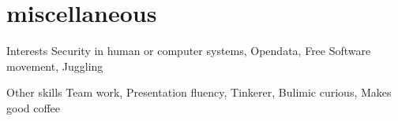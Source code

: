 \documentclass[]{friggeri-cv} %
\begin{document}

\section{miscellaneous}

\begin{entrylist}
\entry
{Interests}{}{}
{Security in human or computer systems, Opendata, Free Software movement, Juggling}

\entry
{Other skills}{}{}
{Team work, Presentation fluency, Tinkerer, Bulimic curious, Makes good coffee}

\end{entrylist}
\end{document}
